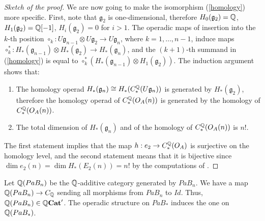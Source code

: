 \documentclass[TFM.tex]{subfiles}
\begin{document}
\begin{proof}[Sketch of the proof]
We are now going to make the isomorphism (\ref{homology}) more specific. First, note that $\mathfrak{g}_2$ is
one-dimensional, therefore $H_0(\mathfrak{g}_2)=\mathbb{Q}$, $H_1(\mathfrak{g}_2)=\mathbb{Q}[-1]$, $H_i(\mathfrak{g}_2)=0$ for $i > 1$. The operadic maps of insertion into the $k$-th position $\circ_k:U\mathfrak{g}_{n-1}\otimes U\mathfrak{g}_2\to U\mathfrak{g}_n$, where $k=1,\dots, n-1$, induce maps $\circ_k^*:H_*(\mathfrak{g}_{n-1})\otimes H_*(\mathfrak{g}_2)\to H_*(\mathfrak{g}_n)$, and the $(k+1)$-th summand in (\ref{homology}) is equal to $\circ_k^*(H_*(\mathfrak{g}_{n-1})\otimes H_1(\mathfrak{g}_2))$. The induction argument
shows that:
\begin{enumerate}
\item The homology operad $H_*(\mathfrak{g}_n)\cong H_*(C_*^{\mathbb{Q}}(U\mathfrak{g}_n))$ is generated by $H_*(\mathfrak{g}_2)$, therefore the homology operad of $C_*^{\mathbb{Q}}(O_A(n))$ is generated by the homology of $C_*^{\mathbb{Q}}(O_A(n))$.
\item The total dimension of $H_*(\mathfrak{g}_n)$ and of the homology of $C_*^{\mathbb{Q}}(O_A(n))$ is $n!$.  
\end{enumerate}

The first statement implies that the map $h:e_2\to C_*^{\mathbb{Q}}(O_A)$ is surjective on the homology level, and
the second statement means that it is bijective since $\dim e_2(n)=\dim H_*(E_2(n))= n!$ by the computations of \cite{cuentas}.

\end{proof}
%
%
Let $\mathbb{Q}(PaB_n)$ be the $\mathbb{Q}$-additive category generated by $PaB_n$. We have a map
$\mathbb{Q}(PaB_n)\to C_{\mathbb{Q}}$ sending all morphisms from $PaB_n$ to $Id$. Thus, $\mathbb{Q}(PaB_n)\in \mathbb{Q}\mathrm{\mathbf{Cat}}'$.
The operadic structure on $PaB_*$ induces the one on $\mathbb{Q}(PaB_*)$. 
\end{document}

